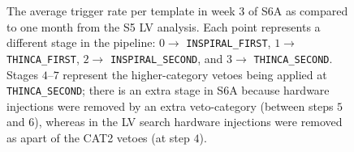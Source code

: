 \begin{figure}[p]
\center
{}
\label{fig:avg_rate_per_tmplt}
\caption{The average trigger rate per template in week 3 of S6A as compared to one month from the \ac{S5} LV analysis. Each point represents a different stage in the pipeline: $0 \rightarrow$ \texttt{INSPIRAL\_FIRST}, $1 \rightarrow$ \texttt{THINCA\_FIRST}, $2 \rightarrow$ \texttt{INSPIRAL\_SECOND}, and $3 \rightarrow$ \texttt{THINCA\_SECOND}. Stages $4$--$7$ represent the higher-category vetoes being applied at \texttt{THINCA\_SECOND}; there is an extra stage in S6A because hardware injections were removed by an extra veto-category (between steps $5$ and $6$), whereas in the LV search hardware injections were removed as apart of the CAT2 vetoes (at step $4$).}
\end{figure}


